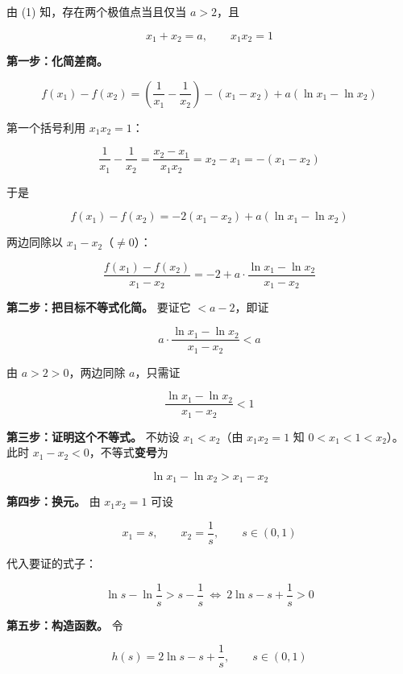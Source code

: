 \begin{answer}

由 (1) 知，存在两个极值点当且仅当 $a>2$，且

\nopagebreak[4]
\[x_1+x_2=a,\qquad x_1x_2=1\]

\textbf{第一步：化简差商。}

\nopagebreak[4]
\[f\left(x_1\right)-f\left(x_2\right)=\left(\frac1{x_1}-\frac1{x_2}\right)-\left(x_1-x_2\right)+a\left(\ln x_1-\ln x_2\right)\]

第一个括号利用 $x_1x_2=1$：

\nopagebreak[4]
\[\frac1{x_1}-\frac1{x_2}=\frac{x_2-x_1}{x_1x_2}=x_2-x_1=-\left(x_1-x_2\right)\]

于是

\nopagebreak[4]
\[f\left(x_1\right)-f\left(x_2\right)=-2\left(x_1-x_2\right)+a\left(\ln x_1-\ln x_2\right)\]

两边同除以 $x_1-x_2$（$\ne0$）：

\nopagebreak[4]
\[\frac{f\left(x_1\right)-f\left(x_2\right)}{x_1-x_2}=-2+a\cdot\frac{\ln x_1-\ln x_2}{x_1-x_2}\]

\textbf{第二步：把目标不等式化简。} 要证它 $<a-2$，即证

\nopagebreak[4]
\[a\cdot\frac{\ln x_1-\ln x_2}{x_1-x_2}<a\]

由 $a>2>0$，两边同除 $a$，只需证

\nopagebreak[4]
\[\frac{\ln x_1-\ln x_2}{x_1-x_2}<1\]

\textbf{第三步：证明这个不等式。} 不妨设 $x_1<x_2$（由 $x_1x_2=1$ 知 $0<x_1<1<x_2$）。此时 $x_1-x_2<0$，不等式\textbf{变号}为

\nopagebreak[4]
\[\ln x_1-\ln x_2>x_1-x_2\]

\textbf{第四步：换元。} 由 $x_1x_2=1$ 可设

\nopagebreak[4]
\[x_1=s,\qquad x_2=\frac1s,\qquad s\in(0,1)\]

代入要证的式子：

\nopagebreak[4]
\[\ln s-\ln\frac1s>s-\frac1s\ \Longleftrightarrow\ 2\ln s-s+\frac1s>0\]

\textbf{第五步：构造函数。} 令

\nopagebreak[4]
\[h(s)=2\ln s-s+\frac1s,\qquad s\in(0,1)\]


\end{answer}
